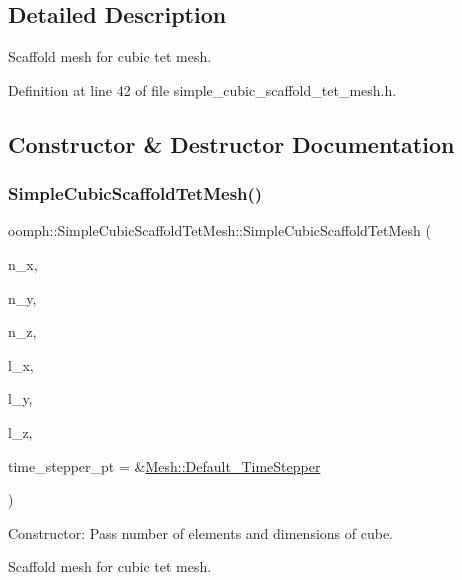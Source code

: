 \subsection{Detailed Description}
Scaffold mesh for cubic tet mesh. 

Definition at line 42 of file simple\+\_\+cubic\+\_\+scaffold\+\_\+tet\+\_\+mesh.\+h.



\subsection{Constructor \& Destructor Documentation}
\mbox{\label{classoomph_1_1SimpleCubicScaffoldTetMesh_ae5e28728db973c9c33ca787658028fd3}} 
\subsubsection{\texorpdfstring{Simple\+Cubic\+Scaffold\+Tet\+Mesh()}{SimpleCubicScaffoldTetMesh()}}
{\footnotesize\ttfamily oomph\+::\+Simple\+Cubic\+Scaffold\+Tet\+Mesh\+::\+Simple\+Cubic\+Scaffold\+Tet\+Mesh (\begin{DoxyParamCaption}\item[{const unsigned \&}]{n\+\_\+x,  }\item[{const unsigned \&}]{n\+\_\+y,  }\item[{const unsigned \&}]{n\+\_\+z,  }\item[{const double \&}]{l\+\_\+x,  }\item[{const double \&}]{l\+\_\+y,  }\item[{const double \&}]{l\+\_\+z,  }\item[{\hyperlink{classoomph_1_1TimeStepper}{Time\+Stepper} $\ast$}]{time\+\_\+stepper\+\_\+pt = {\ttfamily \&\hyperlink{classoomph_1_1Mesh_a12243d0fee2b1fcee729ee5a4777ea10}{Mesh\+::\+Default\+\_\+\+Time\+Stepper}} }\end{DoxyParamCaption})}



Constructor\+: Pass number of elements and dimensions of cube. 

Scaffold mesh for cubic tet mesh. 

